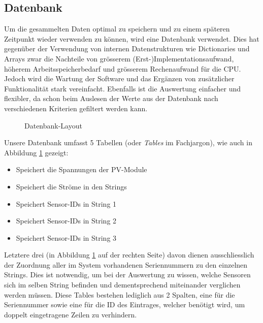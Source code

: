 \clearpage
\subsection{Datenbank}
\label{subsec:software:master:database}


Um  die  gesammelten  Daten  optimal  zu speichern  und  zu  einem  sp\"ateren
Zeitpunkt wieder  verwenden zu  k\"onnen, wird eine  Datenbank verwendet. Dies
hat gegen\"uber  der Verwendung von internen  Datenstrukturen wie Dictionaries
und Arrays  zwar die Nachteile von  gr\"osserem (Erst-)Implementationsaufwand,
h\"oherem  Arbeitsspeicherbedarf  und   gr\"osserem  Rechenaufwand  f\"ur  die
CPU. Jedoch   wird  die   Wartung  der   Software  und   das  Erg\"anzen   von
zus\"atzlicher   Funktionalit\"at   stark   vereinfacht. Ebenfalls   ist   die
Auswertung einfacher und  flexibler, da schon beim Auslesen der  Werte aus der
Datenbank nach verschiedenen Kriterien gefiltert werden kann.

\begin{figure}[h!tb]
    \centering
    
    \caption{Datenbank-Layout}
  \label{fig:database:layout}
\end{figure}


Unsere Datenbank  umfasst 5 Tabellen  (oder \emph{Tables} im  Fachjargon), wie
auch in Abbildung \ref{fig:database:layout} gezeigt:

\begin{itemize}
    \tightlist
    \item
         Speichert die Spannungen der PV-Module
    \item
         Speichert die Str\"ome in den Strings
    \item
         Speichert Sensor-IDs in String 1
    \item
         Speichert Sensor-IDs in String 2
    \item
         Speichert Sensor-IDs in String 3
\end{itemize}

Letztere drei  (in Abbildung \ref{fig:database:layout} auf  der rechten Seite)
davon  dienen  ausschliesslich  der  Zuordnung  aller  im  System  vorhandenen
Seriennummern  zu  den  einzelnen  Strings. Dies ist  notwendig,  um  bei  der
Auswertung  zu wissen,  welche Sensoren  sich  im selben  String befinden  und
dementsprechend miteinander verglichen  werden m\"ussen. Diese Tables bestehen
lediglich aus 2  Spalten, eine f\"ur die Seriennummer sowie  eine f\"ur die ID
des  Eintrages, welcher  ben\"otigt wird,  um doppelt  eingetragene Zeilen  zu
verhindern.

